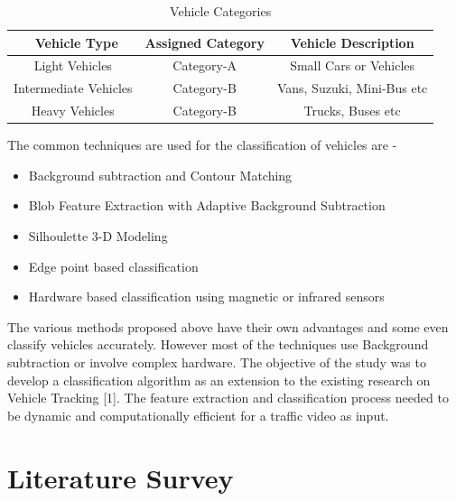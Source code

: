 \documentclass[a4paper,12pt]{article}
\begin{document}
\begin{table}[h!]
	\centering
	\caption{Vehicle Categories}
	\label{tab:table1}
	\vspace{0.1in}
	\begin{tabular}{|c|c|c|}
		\hline
		\ Vehicle Type & Assigned Category & Vehicle Description \\[0.2cm]
		\hline
		Light Vehicles & Category-A & Small Cars or Vehicles \\[0.2cm]
		Intermediate Vehicles & Category-B & Vans, Suzuki, Mini-Bus etc \\[0.2cm]
		Heavy Vehicles & Category-B & Trucks, Buses etc \\[0.2cm]
		\hline
	\end{tabular}
\end{table}

\begin{flushleft}
\vspace{0.1in}
The common techniques are used for the classification of vehicles are - 
\end{flushleft}
\begin{itemize}
\setlength{\itemindent}{.2in}
\item Background subtraction and Contour Matching
\item Blob Feature Extraction with Adaptive Background Subtraction
\item Silhoulette 3-D Modeling
\item Edge point based classification
\item Hardware based classification using magnetic or infrared sensors
\end{itemize}

\vspace{0.1in}
\begin{flushleft}
	The various methods proposed above have their own advantages and some even classify vehicles accurately. However most of the techniques use Background subtraction or involve complex hardware. The objective of the study was to develop a classification algorithm as an extension to the existing research on Vehicle Tracking [1]. The feature extraction and classification process needed to be dynamic and computationally efficient for a traffic video as input.
\end{flushleft}

\newpage
\section{Literature Survey}
\end{document}
